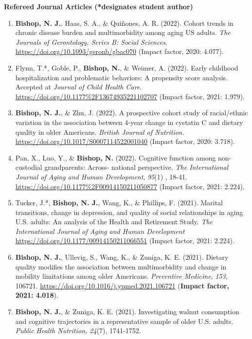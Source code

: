 \documentclass[
]{article}
\begin{document}
\textbf{Refereed Journal Articles (*designates student author)}

\begin{enumerate}
\def\labelenumi{\arabic{enumi}.}
\item
  \textbf{Bishop, N. J.}, Haas, S. A., \& Quiñones, A. R. (2022). Cohort
  trends in chronic disease burden and multimorbidity among aging US
  adults. \emph{The Journals of Gerontology, Series B: Social Sciences}.
  \url{https://doi.org/10.1093/geronb/gbac070} (Impact factor, 2020:
  4.077).
\item
  Flynn, T.*, Goble, P., \textbf{Bishop, N.}, \& Weimer, A. (2022).
  Early childhood hospitalization and problematic behaviors: A
  propensity score analysis. Accepted at \emph{Journal of Child Health
  Care}. \url{https://doi.org/10.1177\%2F13674935221102707} (Impact
  factor, 2021: 1.979).
\item
  \textbf{Bishop, N. J.}, \& Zhu, J. (2022). A prospective cohort study
  of racial/ethnic variation in the association between 4-year change in
  cystatin C and dietary quality in older Americans. \emph{British
  Journal of Nutrition}. \url{https://doi.org/10.1017/S0007114522001040}
  (Impact factor, 2020: 3.718).
\item
  Pan, X., Luo, Y., \& \textbf{Bishop, N.} (2022). Cognitive function
  among non-custodial grandparents: Across- national perspective.
  \emph{The International Journal of Aging and Human Development},
  \emph{95}(1) , 18-41.
  \url{https://doi.org/10.1177\%2F00914150211050877} (Impact factor,
  2021: 2.224).
\item
  Tucker, J.*, \textbf{Bishop, N. J.}, Wang, K., \& Phillips, F. (2021).
  Marital transitions, change in depression, and quality of social
  relationships in aging U.S. adults: An analysis of the Health and
  Retirement Study. \emph{The International Journal of Aging and Human
  Development} \url{https://doi.org/10.1177/00914150211066551} (Impact
  factor, 2021: 2.224).
\item
  \textbf{Bishop, N. J.}, Ullevig, S., Wang, K., \& Zuniga, K. E.
  (2021). Dietary quality modifies the association between
  multimorbidity and change in mobility limitations among older
  Americans. \emph{Preventive Medicine}, \emph{153}, 106721.
  \url{https://doi.org/10.1016/j.ypmed.2021.106721} (\textbf{Impact
  factor, 2021: 4.018}).
\item
  \textbf{Bishop, N. J.}, \& Zuniga, K. E. (2021). Investigating walnut
  consumption and cognitive trajectories in a representative sample of
  older U.S. adults. \emph{Public Health Nutrition, 24}(7), 1741-1752.

\end{enumerate}
\end{document}
